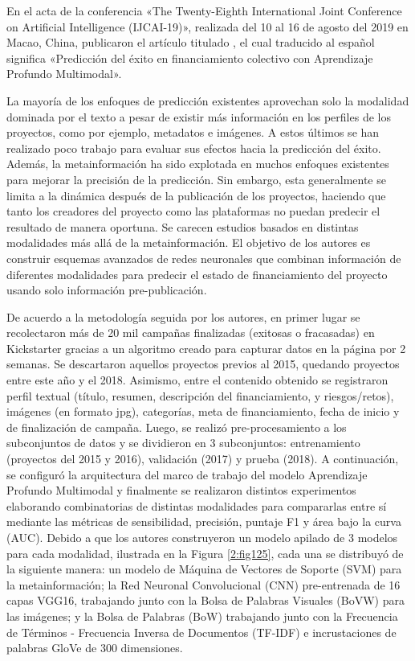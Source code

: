 En el acta de la conferencia «The Twenty-Eighth International Joint Conference on Artificial Intelligence (IJCAI-19)», realizada del 10 al 16 de agosto del 2019 en Macao, China, \cite{pr_cheng2019deeplearning} publicaron el artículo titulado , el cual traducido al español significa «Predicción del éxito en financiamiento colectivo con Aprendizaje Profundo Multimodal».

La mayoría de los enfoques de predicción existentes aprovechan solo la modalidad dominada por el texto a pesar de existir más información en los perfiles de los proyectos, como por ejemplo, metadatos e imágenes. A estos últimos se han realizado poco trabajo para evaluar sus efectos hacia la predicción del éxito. Además, la metainformación ha sido explotada en muchos enfoques existentes para mejorar la precisión de la predicción. Sin embargo, esta generalmente se limita a la dinámica después de la publicación de los proyectos, haciendo que tanto los creadores del proyecto como las plataformas no puedan predecir el resultado de manera oportuna. Se carecen estudios basados en distintas modalidades más allá de la metainformación. El objetivo de los autores es construir esquemas avanzados de redes neuronales que combinan información de diferentes modalidades para predecir el estado de financiamiento del proyecto usando solo información pre-publicación.

De acuerdo a la metodología seguida por los autores, en primer lugar se recolectaron más de 20 mil campañas finalizadas (exitosas o fracasadas) en Kickstarter gracias a un algoritmo creado para capturar datos en la página por 2 semanas. Se descartaron aquellos proyectos previos al 2015, quedando proyectos entre este año y el 2018. Asimismo, entre el contenido obtenido se registraron perfil textual (título, resumen, descripción del financiamiento, y riesgos/retos), imágenes (en formato jpg), categorías, meta de financiamiento, fecha de inicio y de finalización de campaña. Luego, se realizó pre-procesamiento a los subconjuntos de datos y se dividieron en 3 subconjuntos: entrenamiento (proyectos del 2015 y 2016), validación (2017) y prueba (2018). A continuación, se configuró la arquitectura del marco de trabajo del modelo Aprendizaje Profundo Multimodal y finalmente se realizaron distintos experimentos elaborando combinatorias de distintas modalidades para compararlas entre sí mediante las métricas de sensibilidad, precisión, puntaje F1 y área bajo la curva (AUC). Debido a que los autores construyeron un modelo apilado de 3 modelos para cada modalidad, ilustrada en la Figura \ref{2:fig125}, cada una se distribuyó de la siguiente manera: un modelo de Máquina de Vectores de Soporte (SVM) para la metainformación; la Red Neuronal Convolucional (CNN) pre-entrenada de 16 capas VGG16, trabajando junto con la Bolsa de Palabras Visuales (BoVW) para las imágenes; y la Bolsa de Palabras (BoW) trabajando junto con la Frecuencia de Términos - Frecuencia Inversa de Documentos (TF-IDF) e incrustaciones de palabras GloVe de 300 dimensiones.

